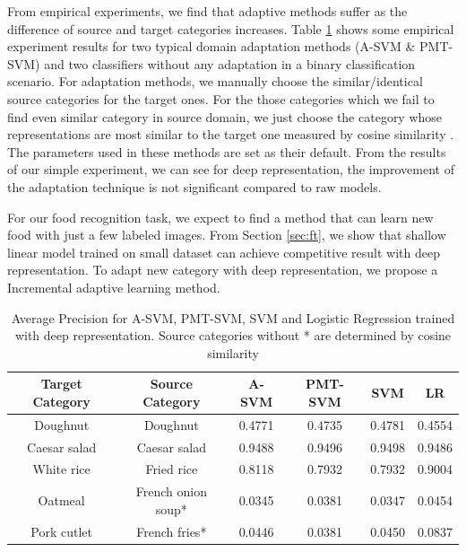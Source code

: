 From empirical experiments, we find that adaptive methods suffer as the difference of source and target categories increases. Table \ref{tab:su_domian} shows some empirical experiment results for two typical domain adaptation methods (A-SVM \& PMT-SVM) and two classifiers without any adaptation in a binary classification scenario. For adaptation methods, we manually choose the similar/identical source categories for the target ones. For the those categories which we fail to find even similar category in source domain, we just choose the category whose representations are most similar to the target one measured by cosine similarity \cite{aytar2011tabula}. The parameters used in these methods are set as their default. From the results of our simple experiment, we can see for deep representation, the improvement of the adaptation technique is not significant compared to raw models.

For our food recognition task, we expect to find a method that can learn new food with just a few labeled images. From Section \ref{sec:ft}, we show that shallow linear model trained on small dataset can achieve competitive result with deep representation. To adapt new category with deep representation, we propose a Incremental adaptive learning method.
\begin{table}[htbp]
  \centering
  \caption{Average Precision for A-SVM, PMT-SVM, SVM and Logistic Regression trained with deep representation. Source categories without * are determined by cosine similarity}
    \begin{tabular}{cccccc}
    \toprule
    Target Category & Source Category & A-SVM  & PMT-SVM & SVM &LR\\
    \midrule
    Doughnut & Doughnut & 0.4771 & 0.4735 &0.4781&0.4554\\
    Caesar salad &  Caesar salad & 0.9488 & 0.9496 &0.9498&0.9486\\
    White rice  & Fried rice & 0.8118 & 0.7932 &0.7932&0.9004\\
    Oatmeal & French onion soup* & 0.0345 & 0.0381 & 0.0347 &0.0454\\
    Pork cutlet & French fries* & 0.0446 & 0.0381 &0.0450& 0.0837\\
    \bottomrule
    \end{tabular}%
  \label{tab:su_domian}%
\end{table}%


